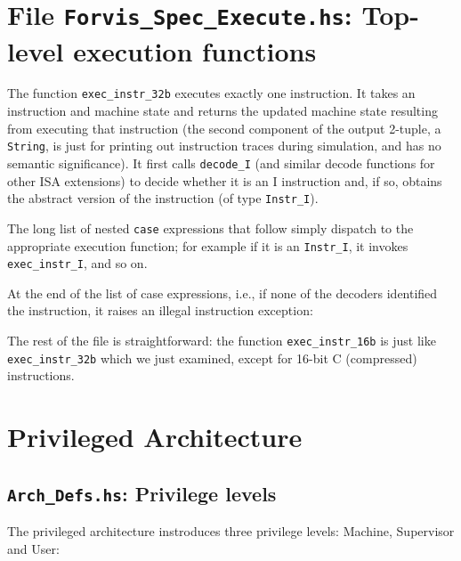\documentclass[11pt]{article}
\begin{document}
\section{File {\tt Forvis\_Spec\_Execute.hs}: Top-level execution functions}

\label{sec_execute}

The function \verb|exec_instr_32b| executes exactly one instruction.
It takes an instruction and machine state and returns the updated
machine state resulting from executing that instruction (the second
component of the output 2-tuple, a \verb|String|, is just for printing
out instruction traces during simulation, and has no semantic
significance).  It first calls \verb|decode_I| (and similar decode
functions for other ISA extensions) to decide whether it is an I
instruction and, if so, obtains the abstract version of the
instruction (of type \verb|Instr_I|).



The long list of nested \verb|case| expressions that follow simply
dispatch to the appropriate execution function; for example if it is
an \verb|Instr_I|, it invokes \verb|exec_instr_I|, and so on.



At the end of the list of case expressions, i.e., if none of the
decoders identified the instruction, it raises an illegal instruction
exception:



The rest of the file is straightforward: the function
\verb|exec_instr_16b| is just like \verb|exec_instr_32b| which we just
examined, except for 16-bit C (compressed) instructions.


\section{Privileged Architecture}


\subsection{{\tt Arch\_Defs.hs}: Privilege levels}

The privileged architecture instroduces three privilege
levels: Machine, Supervisor and User:
\end{document}
